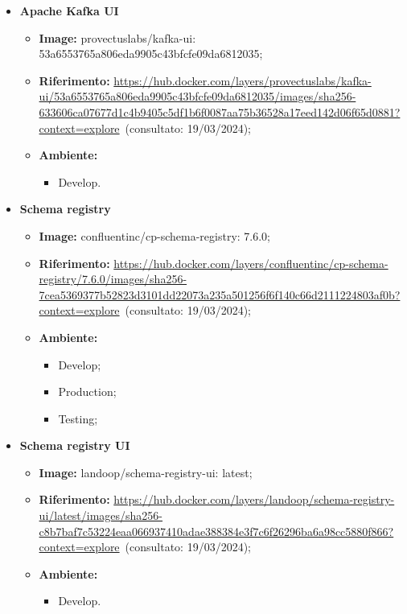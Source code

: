 \begin{itemize}
  \item \textbf{Apache Kafka UI} 
    \begin{itemize}
      \item \textbf{Image:} provectuslabs/kafka-ui: 53a6553765a806eda9905c43bfcfe09da6812035;
      \item \textbf{Riferimento:} \url{https://hub.docker.com/layers/provectuslabs/kafka-ui/53a6553765a806eda9905c43bfcfe09da6812035/images/sha256-633606ca07677d1c4b9405c5df1b6f0087aa75b36528a17eed142d06f65d0881?context=explore}~(consultato: 19/03/2024);
      \item \textbf{Ambiente:}
        \begin{itemize}
          \item Develop.
        \end{itemize}
    \end{itemize}

  \item \textbf{Schema registry} 
    \begin{itemize}
      \item \textbf{Image:} confluentinc/cp-schema-registry: 7.6.0;
      \item \textbf{Riferimento:} \url{https://hub.docker.com/layers/confluentinc/cp-schema-registry/7.6.0/images/sha256-7cea5369377b52823d3101dd22073a235a501256f6f140c66d2111224803af0b?context=explore}~(consultato: 19/03/2024);
      \item \textbf{Ambiente:}
        \begin{itemize}
          \item Develop;
          \item Production;
          \item Testing;
        \end{itemize}
    \end{itemize}

  \item \textbf{Schema registry UI} 
    \begin{itemize}
      \item \textbf{Image:} landoop/schema-registry-ui: latest;
      \item \textbf{Riferimento:} \url{https://hub.docker.com/layers/landoop/schema-registry-ui/latest/images/sha256-c8b7baf7c53224eaa066937410adae388384e3f7c6f26296ba6a98cc5880f866?context=explore}~(consultato: 19/03/2024);
      \item \textbf{Ambiente:}
        \begin{itemize}
          \item Develop.
        \end{itemize}
    \end{itemize}


\end{itemize}
